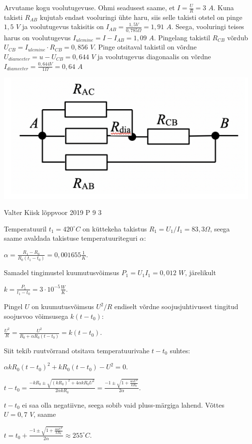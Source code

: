 \documentclass[11pt]{article}
\begin{document}
{{Arvutame kogu voolutugevuse. Ohmi seadusest saame, et 
$I = \frac{U}{R} = 3$ $A$.
Kuna takisti $R_{AB}$ kujutab endast vooluringi ühte haru, siis selle takisti otstel on pinge $1,5$ $V$ ja voolutugevus takisitis on $I_{AB} = \frac{1,5V}{0,785 \Omega} = 1,91$ $A$.
Seega, vooluringi teises harus on voolutugevus 
$I_{ulemine} = I - I_{AB} = 1,09$ $A$.
Pingelang takistil $R_{CB}$ võrdub $U_{CB} = I_{ulemine} \cdot R_{CB} = 0,856 $ $V$.
Pinge otsitaval takistil on võrdne $U_{diameeter} = u- U_{CB} = 0,644$ $V$ ja voolutugevus diagonaalis on võrdne
$I_{diameeter} = \frac{0,644V}{1 \Omega} = 0,64$ $A$
\begin{center}
	\includegraphics[width=0.5\linewidth]{2019-v3p-07-lah.png}
\end{center}
\fi
}

{Valter Kiisk} %
{lõppvoor} %
{2019} %
{P 9} %
{3} %
{

\ifSolution
Temperatuuril $t_1 = 420 ^{\circ}C$ on küttekeha takistus $R_1 = U_1 / I_1 = 83,3 \Omega$, seega saame avaldada takistuse temperatuuriteguri $\alpha$:
\begin{center}
$\alpha = \frac{R_1 - R_0}{R_0(t_1 - t_0)} = 0,001 655 \frac{1}{K}$.
\end{center}
Samadel tingimustel kuumutusvõimsus $P_1 = U_1 I_1 = 0,012$ $W$, järelikult
\begin{center}
$k = \frac{P_1}{t_1 - t_0} = 3 \cdot 10 ^{-5} \frac{W}{K}$.
\end{center}
Pingel $U$ on kuumutusvõimsus $U^2 / R$ endiselt võrdne soojusjuhtivusest tingitud soojusvoo võimsusega $k(t - t_0)$:
\begin{center}
$\frac{U^2}{R} = \frac{U^2}{R_0 + \alpha R_0(t - t_0)} = k(t - t_0)$.
\end{center}
Siit tekib ruutvõrrand otsitava temperatuurivahe $t - t_0$ suhtes:
\begin{center}
$\alpha k R_0 (t - t_0)^2 + k R_0(t - t_0) - U^2 = 0$.
\end{center}
\begin{center}
$t - t_0 = \frac{- k R_0 \pm \sqrt{(k R_0)^2 + 4 \alpha k R_0 U^2}}{2 \alpha k R_0} = \frac{-1 \pm \sqrt{1 + \frac{4 \alpha U^2}{k R_0}}}{2 \alpha}$.
\end{center}
$t - t_0$ ei saa olla negatiivne, seega sobib vaid pluss-märgiga lahend. Võttes $U = 0,7$ $V$, saame
\begin{center}
$t = t_0 + \frac{-1 \pm \sqrt{1 + \frac{4 \alpha U^2}{k R_0}}}{2 \alpha} \approx 255 ^{\circ}C$.
\end{center}
\fi
}

}
\end{document}
